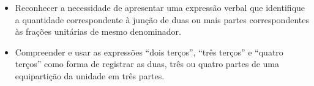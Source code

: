   \begin{objetivos}{}{}
  \begin{itemize} %
    \item Reconhecer a necessidade de apresentar uma expressão verbal que identifique a quantidade correspondente à junção de duas ou mais partes correspondentes às frações unitárias de mesmo denominador.
\item Compreender e usar as expressões ``dois terços'', ``três terços'' e ``quatro terços'' como forma de registrar as duas, três ou quatro partes de uma equipartição da unidade em três partes.
  \end{itemize} %
\end{objetivos}
\newpage

